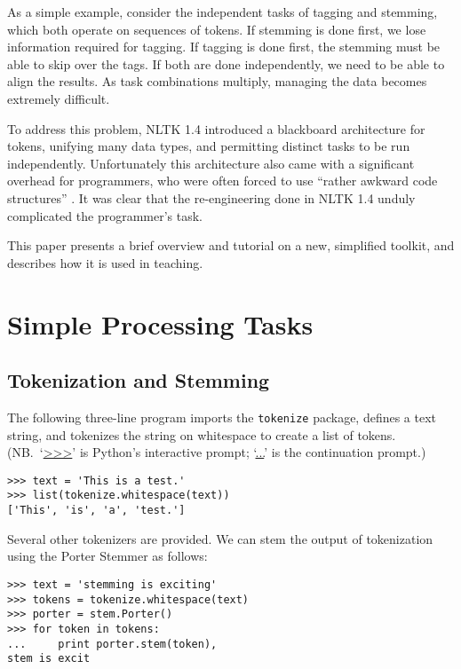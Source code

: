 \documentclass[11pt]{article}
\begin{document}
As a simple example, consider the independent tasks of tagging and
stemming, which both operate on sequences of tokens.  If stemming is
done first, we lose information required for tagging.  If tagging is
done first, the stemming must be able to skip over the tags.  If both
are done independently, we need to be able to align the results.  As
task combinations multiply, managing the data becomes extremely
difficult.

To address this problem, NLTK 1.4 introduced a blackboard architecture
for tokens, unifying many data types, and permitting distinct tasks to
be run independently.  Unfortunately this architecture also came with
a significant overhead for programmers, who were often forced to use
``rather awkward code structures'' \cite{Hearst05}.  It was clear that
the re-engineering done in NLTK 1.4 unduly complicated the
programmer's task.

This paper presents a brief overview and tutorial on a new, simplified
toolkit, and describes how it is used in teaching.

\section{Simple Processing Tasks}

\subsection{Tokenization and Stemming}

The following three-line program imports the \texttt{tokenize}
package, defines a text string, and tokenizes the string on
whitespace to create a list of tokens.  (NB.\ `\url{>>>}' is
Python's interactive prompt; `\url{...}' is the continuation prompt.)

{\small\begin{verbatim}
>>> text = 'This is a test.'
>>> list(tokenize.whitespace(text))
['This', 'is', 'a', 'test.']
\end{verbatim}}

\noindent
Several other tokenizers are provided.  We can stem the output of tokenization
using the Porter Stemmer as follows:

{\small\begin{verbatim}
>>> text = 'stemming is exciting'
>>> tokens = tokenize.whitespace(text)
>>> porter = stem.Porter()
>>> for token in tokens:
...     print porter.stem(token),
stem is excit
\end{verbatim}}
\end{document}
